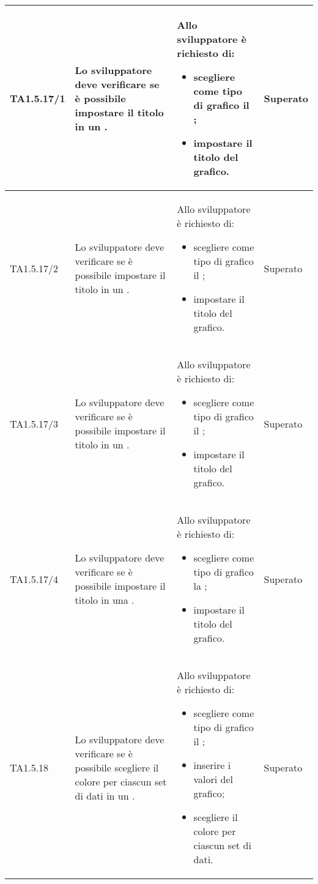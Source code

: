 \begin{longtabu}{| X[0.5] | X | X | X[0.5] |}
	TA1.5.17/1 & Lo sviluppatore deve verificare se è possibile impostare il titolo in un .

		& Allo sviluppatore è richiesto di:
		\begin{itemize}
			\item scegliere come tipo di grafico il ;
			\item impostare il titolo del grafico.
		\end{itemize}
& Superato \\ \hline

	TA1.5.17/2 & Lo sviluppatore deve verificare se è possibile impostare il titolo in un .

		& Allo sviluppatore è richiesto di:
		\begin{itemize}
			\item scegliere come tipo di grafico il ;
			\item impostare il titolo del grafico.
		\end{itemize}
& Superato \\ \hline

	TA1.5.17/3 & Lo sviluppatore deve verificare se è possibile impostare il titolo in un .

		& Allo sviluppatore è richiesto di:
		\begin{itemize}
			\item scegliere come tipo di grafico il ;
			\item impostare il titolo del grafico.
		\end{itemize}
& Superato \\ \hline

	TA1.5.17/4 & Lo sviluppatore deve verificare se è possibile impostare il titolo in una .

		& Allo sviluppatore è richiesto di:
		\begin{itemize}
			\item scegliere come tipo di grafico la ;
			\item impostare il titolo del grafico.
		\end{itemize}
& Superato \\ \hline

	TA1.5.18 & Lo sviluppatore deve verificare se è possibile scegliere il colore per ciascun set di dati in un .

		& Allo sviluppatore è richiesto di:
		\begin{itemize}
			\item scegliere come tipo di grafico il ;
			\item inserire i valori del grafico;
			\item scegliere il colore per ciascun set di dati.
		\end{itemize}
& Superato \\ \hline


\end{longtabu}

